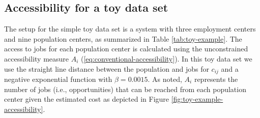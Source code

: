 \documentclass[]{elsarticle} %
\begin{document}
\hypertarget{accessibility-numerical-example}{%
\subsection{Accessibility for a toy data
set}\label{accessibility-numerical-example}}

The setup for the simple toy data set is a system with three employment
centers and nine population centers, as summarized in Table
\ref{tab:toy-example}. The access to jobs for each population center is
calculated using the unconstrained accessibility measure \(A_i\)
(\ref{eq:conventional-accessibility}). In this toy data set we use the
straight line distance between the population and jobs for \(c_{ij}\)
and a negative exponential function with \(\beta = 0.0015\). As noted,
\(A_i\) represents the number of jobs (i.e., opportunities) that can be
reached from each population center given the estimated cost as depicted
in Figure \ref{fig:toy-example-accessibility}.
\end{document}
